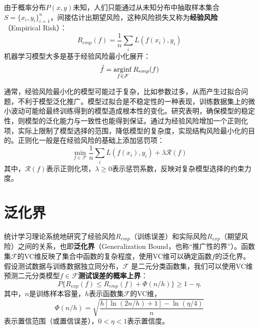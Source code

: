 由于概率分布$P(x,y)$未知，人们只能通过从未知分布中抽取样本集合$S=\{x_i,y_i\}_{i=1}^n$，间接估计出期望风险，这种风险损失又称为\textbf{经验风险}
（Empirical Risk）：
\begin{equation}\label{eq:empiricalrisk}
    R_{emp}(f) = \frac{1}{n}\sum_i L(f(x_i),y_i)
\end{equation}
机器学习模型大多是基于经验风险最小化展开：
\begin{equation}\label{eq:slt-er}
    \hat f = \operatorname*{\mathrm{\arg\!\inf}}\limits_{f\in \mathcal F} R_{emp}(f)
\end{equation}

通常，经验风险最小化的模型可能过于复杂，比如参数过多，从而产生过拟合问题，不利于模型泛化推广。模型过拟合是不稳定性的一种表现，训练数据集上的微小波动可能给最终训练得到的模型造成根本性的变化。研究表明，确保模型的稳定性，则模型的泛化能力与一致性也能得到保证。通过为经验风险增加一个正则化项，实际上限制了模型选择的范围，降低模型的复杂度，实现结构风险最小化的目的。正则化一般是在经验风险的基础上添加惩罚项：
\begin{equation}\label{eq:regularization}
    \min\limits_{f\in \mathcal F}\frac{1}{n}\sum\limits_i L(f(x_i),y_i) + \lambda \mathcal{R}(f)
\end{equation}
其中，$\mathcal{R}(f)$表示正则化项，$\lambda\ge 0$表示惩罚系数，反映对复杂模型选择的约束力度。

\section{泛化界}
统计学习理论系统地研究了经验风险$R_{emp}$（训练误差）和实际风险$R_{exp}$（期望风险）之间的关系，也即\textbf{泛化界}（Generalization Bound，也称“推广性的界”）。函数集$\mathcal F$的VC维反映了集合中函数的复杂程度，使用VC维可以确定函数$f$的泛化界。假设测试数据与训练数据独立同分布，$\mathcal{F}$ 是二元分类函数集，我们可以使用VC维预测二元分类模型$f\in \mathcal{F}$\textbf{测试误差的概率上界}：
\begin{equation}\label{eq:generalizationbound}
    P\bigg\{R_{exp}(f) \le R_{emp}(f) + \varPhi(n/h)\bigg\} \ge 1 - \eta.
\end{equation}
其中，$n$是训练样本容量，$h$表示函数集$\mathcal F$的VC维，
\[
    \varPhi(n/h) = \sqrt{\frac{h[\ln(2n/h) + 1] - \ln(\eta/4)}{n}}
\]
表示置信范围（或置信误差），$0<\eta<1$表示置信度。

